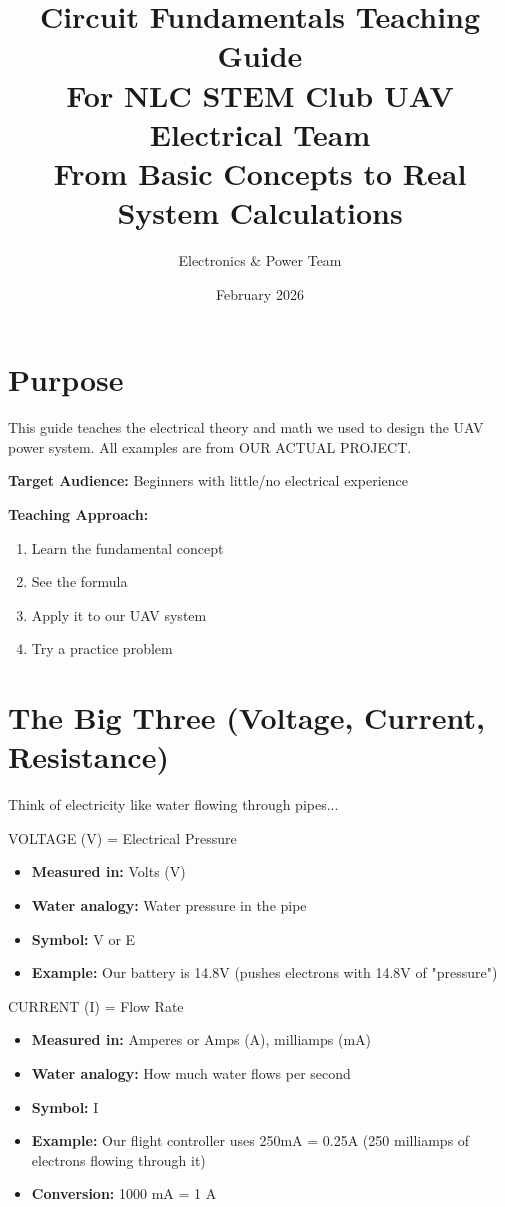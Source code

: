 \documentclass[11pt,letterpaper]{article}
\title{\Huge\textbf{Circuit Fundamentals Teaching Guide}\\
\Large For NLC STEM Club UAV Electrical Team\\
\large From Basic Concepts to Real System Calculations}
\author{Electronics \& Power Team}
\date{February 2026}
\begin{document}
\maketitle
\thispagestyle{empty}

\section*{Purpose}

This guide teaches the electrical theory and math we used to design the UAV power system. All examples are from OUR ACTUAL PROJECT.

\textbf{Target Audience:} Beginners with little/no electrical experience

\textbf{Teaching Approach:}
\begin{enumerate}
  \item Learn the fundamental concept
  \item See the formula
  \item Apply it to our UAV system
  \item Try a practice problem
\end{enumerate}

\newpage
\tableofcontents
\newpage

\section{The Big Three (Voltage, Current, Resistance)}

Think of electricity like water flowing through pipes...

\begin{conceptbox}{VOLTAGE (V) = Electrical Pressure}
\begin{itemize}
  \item \textbf{Measured in:} Volts (V)
  \item \textbf{Water analogy:} Water pressure in the pipe
  \item \textbf{Symbol:} V or E
  \item \textbf{Example:} Our battery is 14.8V (pushes electrons with 14.8V of "pressure")
\end{itemize}
\end{conceptbox}

\vspace{0.5cm}

\begin{conceptbox}{CURRENT (I) = Flow Rate}
\begin{itemize}
  \item \textbf{Measured in:} Amperes or Amps (A), milliamps (mA)
  \item \textbf{Water analogy:} How much water flows per second
  \item \textbf{Symbol:} I
  \item \textbf{Example:} Our flight controller uses 250mA = 0.25A (250 milliamps of electrons flowing through it)
  \item \textbf{Conversion:} 1000 mA = 1 A
\end{itemize}
\end{conceptbox}
\end{document}
